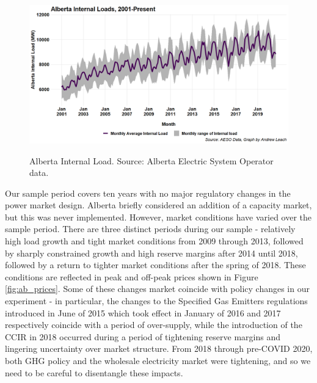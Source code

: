 \documentclass[12pt]{article}
\begin{document}
\begin{figure}[!h]%
	\centering \vspace{-.25cm} \includegraphics[width=6.5in]{images/load_time.png}
\label{fig:ab_load}
\vspace{-0.75cm}	\caption{Alberta Internal Load. Source: Alberta Electric System Operator data.}
\end{figure}

Our sample period covers ten years with no major regulatory changes in the power market design. Alberta briefly considered an addition of a capacity market, but this was never implemented. However, market conditions have varied over the sample period. There are three distinct periods during our sample - relatively high load growth and tight market conditions from 2009 through 2013, followed by sharply constrained growth and high reserve margins after 2014 until 2018, followed by a return to tighter market conditions after the spring of 2018. These conditions are reflected in peak and off-peak prices shown in Figure \ref{fig:ab_prices}. Some of these changes market coincide with policy changes in our experiment - in particular, the changes to the Specified Gas Emitters regulations introduced in June of 2015 which took effect in January of 2016 and 2017 respectively coincide with a period of over-supply, while the introduction of the CCIR in 2018 occurred during a period of tightening reserve margins and lingering uncertainty over market structure. From 2018 through pre-COVID 2020, both GHG policy and the wholesale electricity market were tightening, and so we need to be careful to disentangle these impacts.
\end{document}
